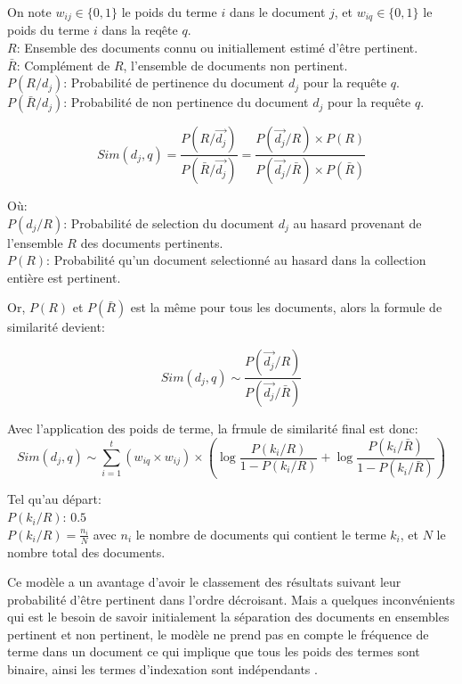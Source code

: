\begin{definition}
    On note $w_{ij} \in \{0, 1\}$ le poids du terme $i$ dans le document $j$, et $w_{iq} \in \{0, 1\}$ le poids du terme $i$ dans la reqête $q$.\\
    $R$: Ensemble des documents connu ou initiallement estimé d'être pertinent.\\
    $\bar{R}$: Complément de $R$, l'ensemble de documents non pertinent.\\
    $P(R/d_{j})$: Probabilité de pertinence du document $d_{j}$ pour la requête $q$. \\
    $P(\bar{R}/d_{j})$: Probabilité de non pertinence du document $d_{j}$ pour la requête $q$.

    \[
        Sim(d_{j}, q) = \frac{ P(R/\vec{d_{j}}) }{ P(\bar{R}/\vec{d_{j}}) } = \frac{P(\vec{d_{j}}/R) \times P(R)}{P(\vec{d_{j}}/\bar{R}) \times P(\bar{R})}
    \]

    Où:\\
    $ P(d_{j}/R) $: Probabilité de selection du document $ d_{j} $ au hasard provenant de l'ensemble $ R $ des documents pertinents.\\
    $ P(R) $: Probabilité qu'un document selectionné au hasard dans la collection entière est pertinent.

    Or, $ P(R) $ et $ P(\bar{R}) $ est la même pour tous les documents, alors la formule de similarité devient:
    
    \[
        Sim(d_{j}, q) \sim \frac{P(\vec{d_{j}}/R)}{P(\vec{d_{j}}/\bar{R})}
    \]

    Avec l'application des poids de terme, la frmule de similarité final est donc:
    \[
        Sim(d_{j}, q) \sim \sum_{i = 1}^{t} (w_{iq} \times w_{ij}) \times \left(
            \log{\frac{P(k_{i}/R)}{1 - P(k_{i}/R)}} + \log{\frac{P(k_{i}/\bar{R})}{1 - P(k_{i}/\bar{R})}}
        \right)
    \]

    Tel qu'au départ:\\
    $ P(k_{i}/R) $: $ 0.5 $ \\
    $ P(k_{i}/R) = \frac{n_{i}}{N} $ avec $ n_{i} $ le nombre de documents qui contient le terme $ k_{i} $, et $ N $ le nombre total des documents.

\end{definition}

Ce modèle a un avantage d'avoir le classement des résultats suivant leur probabilité d'être pertinent dans l'ordre décroisant. Mais a quelques inconvénients qui est le besoin de savoir initialement la séparation des documents en ensembles pertinent et non pertinent, le modèle ne prend pas en compte le fréquence de terme dans un document ce qui implique que tous les poids des termes sont binaire, ainsi les termes d'indexation sont indépendants \citep{modern-ir}.

